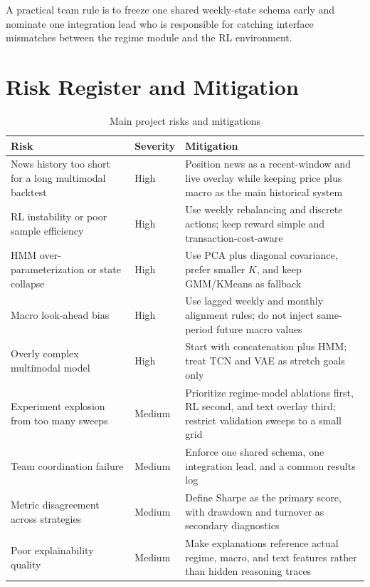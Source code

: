 \documentclass[11pt,a4paper]{article}
\begin{document}
A practical team rule is to freeze one shared weekly-state schema early and nominate one integration lead who is responsible for catching interface mismatches between the regime module and the RL environment.

\section{Risk Register and Mitigation}

\begin{table}[H]
\centering
\caption{Main project risks and mitigations}
\begin{tabularx}{\textwidth}{@{}P{0.24\textwidth}P{0.18\textwidth}Y@{}}
\toprule
{}
\textbf{Risk} & \textbf{Severity} & \textbf{Mitigation} \\
\midrule
News history too short for a long multimodal backtest & High & Position news as a recent-window and live overlay while keeping price plus macro as the main historical system \\
RL instability or poor sample efficiency & High & Use weekly rebalancing and discrete actions; keep reward simple and transaction-cost-aware \\
HMM over-parameterization or state collapse & High & Use PCA plus diagonal covariance, prefer smaller $K$, and keep GMM/KMeans as fallback \\
Macro look-ahead bias & High & Use lagged weekly and monthly alignment rules; do not inject same-period future macro values \\
Overly complex multimodal model & High & Start with concatenation plus HMM; treat TCN and VAE as stretch goals only \\
Experiment explosion from too many sweeps & Medium & Prioritize regime-model ablations first, RL second, and text overlay third; restrict validation sweeps to a small grid \\
Team coordination failure & Medium & Enforce one shared schema, one integration lead, and a common results log \\
Metric disagreement across strategies & Medium & Define Sharpe as the primary score, with drawdown and turnover as secondary diagnostics \\
Poor explainability quality & Medium & Make explanations reference actual regime, macro, and text features rather than hidden reasoning traces \\
\bottomrule
\end{tabularx}
\end{table}
\end{document}
